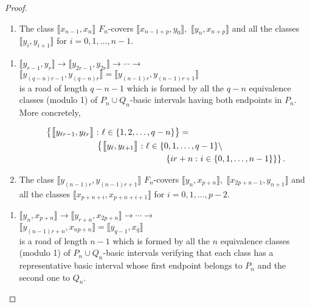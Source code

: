 \documentclass[a4paper, 11pt]{amsart}
\numberwithin{equation}{section}
\theoremstyle{customnumberedtheorem}
\theoremstyle{definitionwithbfnote}
\newcommand{\set}[2]{\ensuremath{\left\{#1 \,\colon #2\right\}}}
\newcommand{\bigBIclass}[1]{\ensuremath{\bigl\llbracket #1\bigr\rrbracket}}
\begin{document}
\begin{proof}
\begin{enumerate}
\item The class $\bigBIclass{x_{n-1},x_{n}}$ $F_n$-covers
  $\bigBIclass{x_{n-1+p},y_0},$ $\bigBIclass{y_n,x_{n+p}}$
  and all the classes
  $\bigBIclass{y_i,y_{i+1}}$ for $i=0,1,\dots, n-1.$
\end{enumerate}
\begin{enumerate}
\item $
  \bigBIclass{y_{r-1},y_{r}} \longrightarrow
  \bigBIclass{y_{2r-1},y_{2r}} \longrightarrow\cdots \longrightarrow$\\
  \hspace*{\fill}$\bigBIclass{y_{(q-n)r-1},y_{(q-n)r}} = \bigBIclass{y_{(n-1)r},y_{(n-1)r + 1}}
$\\[\smallskipamount]
is a road of length $q-n-1$ which is formed by all the
$q-n$ equivalence classes (modulo 1) of
$P_n \cup Q_n$-basic intervals having both endpoints in $P_n.$
More concretely,\addtocounter{equation}{-1}
\begin{equation}\label{road2-Classes}
\begin{split}
 & \set{\bigBIclass{y_{\ell r-1},y_{\ell r}}}{\ell \in \{1,2,\dots,q-n\}} = \\
 & \hspace*{6em}\left\{\bigBIclass{y_\ell,y_{\ell+1}}\,\colon \ell \in \{0,1,\dots,q-1\}\setminus \right. \\
 & \hspace*{14em}\left.\set{i r + n}{i\in\{0,1,\dots,n-1\}}\right\}.
\end{split}
\end{equation}

\item The class $\bigBIclass{y_{(n-1)r},y_{(n-1)r + 1}}$ $F_n$-covers
  $\bigBIclass{y_n,x_{p+n}},$ $\bigBIclass{x_{2p+n-1},y_{n+1}}$
  and all the classes
  $\bigBIclass{x_{p+n+i},x_{p+n+i+1}}$ for $i=0,1,\dots, p-2.$
\end{enumerate}
\begin{enumerate}
\item $
  \bigBIclass{y_n,x_{p+n}} \longrightarrow
  \bigBIclass{y_{r+n},x_{2p+n}} \longrightarrow\cdots \longrightarrow$\\
  \hspace*{\fill}$\bigBIclass{y_{(n-1)r+n},x_{np+n}} = \bigBIclass{y_{q-1},x_q}
$\\[\smallskipamount]
is a road of length $n-1$ which is formed by all the $n$ equivalence
classes (modulo 1) of $P_n \cup Q_n$-basic intervals
verifying that  each class has a representative basic interval
whose first endpoint belongs to $P_n$ and the second one to $Q_n.$


\end{enumerate}
\end{proof}
\end{document}
